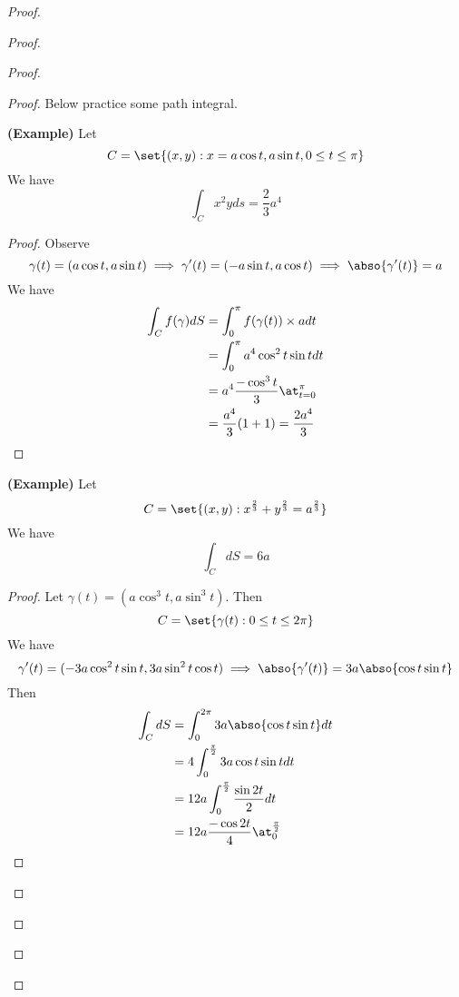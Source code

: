 \documentclass{report}
\begin{document}
\begin{proof}
\begin{proof}
\begin{proof}
\begin{proof}
{\begin{minipage}{39em}
Below practice some path integral.
\end{minipage}}
\begin{theorem}
\label{9.1.4}
\textbf{(Example)} Let
\begin{equation}
C=\set{(x,y):x=a\cos t,a\sin t, 0\leq t\leq \pi}
\end{equation}
We have
\begin{equation}
\int_C x^2y ds=\frac{2}{3}a^4
\end{equation}
\end{theorem}
\begin{proof}
Observe
\begin{equation}
\gamma (t)=(a\cos t,a\sin t)\implies \gamma '(t)=(-a\sin t,a\cos t)\implies \abso{\gamma '(t)}=a
\end{equation}
We have
\begin{align}
\int_C f(\gamma ) dS&=\int_0^{\pi} f(\gamma (t))\times adt\\
&=\int_0^{\pi} a^4 \cos^2t \sin tdt\\
&=a^4 \frac{-\cos^3 t}{3}\at_{t=0}^\pi\\
&=\frac{a^4}{3}(1+1)=\frac{2a^4}{3}
\end{align}
\end{proof}
\begin{theorem}
\label{9.1.5}
\textbf{(Example)} Let
\begin{equation}
  C=\set{(x,y):x^{\frac{2}{3}}+y^{\frac{2}{3}}=a ^{\frac{2}{3}}}
\end{equation}
We have
\begin{equation}
\int_C dS= 6a
\end{equation}
\end{theorem}
\begin{proof}
Let $\gamma (t)=(a\cos^3 t,a\sin^3 t)$. Then 
\begin{equation}
C=\set{\gamma  (t):0\leq t\leq  2\pi }
\end{equation}
We have
\begin{equation}
\gamma '(t)=(-3a\cos ^2t \sin t,3a\sin^2 t\cos t)\implies \abso{\gamma '(t)}=3a\abso{\cos t\sin t}
\end{equation}
Then
\begin{align}
\int_C dS&= \int_0^{2\pi} 3a\abso{\cos t\sin t}dt\\
&=4\int_0^{\frac{\pi}{2}}3a \cos t \sin tdt\\
&=12a\int_0^{\frac{\pi}{2}}\frac{\sin 2t}{2}dt\\
&=12a \frac{-\cos 2t}{4}\at_{0}^{\frac{\pi}{2}}\\

\end{align}
\end{proof}
\end{proof}
\end{proof}
\end{proof}
\end{proof}
\end{document}
